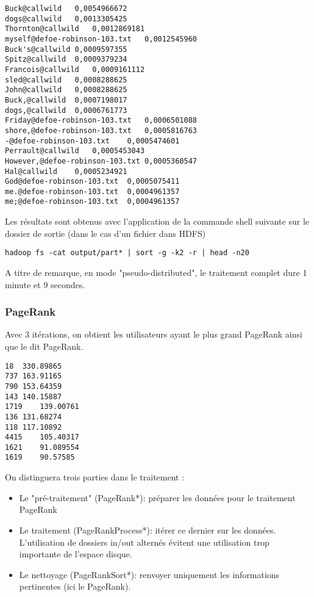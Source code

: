 \documentclass[french]{article}
\begin{document}
\begin{verbatim}
Buck@callwild	0,0054966672
dogs@callwild	0,0013305425
Thornton@callwild	0,0012869181
myself@defoe-robinson-103.txt	0,0012545960
Buck's@callwild	0,0009597355
Spitz@callwild	0,0009379234
Francois@callwild	0,0009161112
sled@callwild	0,0008288625
John@callwild	0,0008288625
Buck,@callwild	0,0007198017
dogs,@callwild	0,0006761773
Friday@defoe-robinson-103.txt	0,0006501088
shore,@defoe-robinson-103.txt	0,0005816763
-@defoe-robinson-103.txt	0,0005474601
Perrault@callwild	0,0005453043
However,@defoe-robinson-103.txt	0,0005360547
Hal@callwild	0,0005234921
God@defoe-robinson-103.txt	0,0005075411
me.@defoe-robinson-103.txt	0,0004961357
me;@defoe-robinson-103.txt	0,0004961357
\end{verbatim}

Les résultats sont obtenus avec l'application de la commande shell suivante sur le dossier de sortie (dans le cas d'un fichier dans HDFS)

\begin{verbatim}
hadoop fs -cat output/part* | sort -g -k2 -r | head -n20
\end{verbatim}

A titre de remarque, en mode "pseudo-distributed", le traitement complet dure 1 minute et 9 secondes.

\subsubsection{PageRank}

Avec 3 itérations, on obtient les utilisateurs ayant le plus grand PageRank ainsi que le dit PageRank.

\begin{verbatim}
18	330.89865
737	163.91165
790	153.64359
143	140.15887
1719	139.00761
136	131.68274
118	117.10892
4415	105.40317
1621	91.089554
1619	90.57585
\end{verbatim}

On distinguera trois parties dans le traitement :

\begin{itemize}
	\item Le "pré-traitement" (PageRank*): préparer les données pour le traitement PageRank
	\item Le traitement (PageRankProcess*): itérer ce dernier sur les données. L'utilisation de dossiers in/out alternés évitent une utilisation trop importante de l'espace disque.
	\item Le nettoyage (PageRankSort*): renvoyer uniquement les informations pertinentes (ici le PageRank).
\end{itemize}
\end{document}
